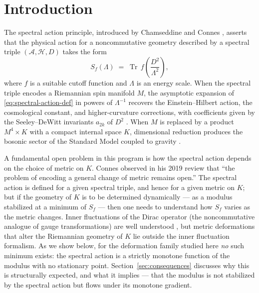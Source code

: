 \documentclass[12pt]{article}
\theoremstyle{definition}
\theoremstyle{remark}
\DeclareMathOperator{\Tr}{Tr}
\begin{document}
\section{Introduction}

The spectral action principle, introduced by Chamseddine and Connes
\cite{Chamseddine1997}, asserts that the physical
action for a noncommutative geometry described by a spectral triple
$(\mathcal{A}, \mathcal{H}, D)$ takes the form
\begin{equation}\label{eq:spectral-action-def}
  S_f(\Lambda) \;=\; \Tr\, f\!\left(\frac{D^2}{\Lambda^2}\right),
\end{equation}
where $f$ is a suitable cutoff function and $\Lambda$ is an energy
scale.  When the spectral triple encodes a Riemannian spin manifold
$M$, the asymptotic expansion of \eqref{eq:spectral-action-def} in
powers of $\Lambda^{-1}$ recovers the Einstein--Hilbert action, the
cosmological constant, and higher-curvature corrections, with
coefficients given by the Seeley--DeWitt invariants $a_{2k}$ of
$D^2$ \cite{Gilkey1995, Vassilevich2003}.  When
$M$ is replaced by a product $M^4 \times K$ with a compact internal
space $K$, dimensional reduction produces the bosonic sector of the
Standard Model coupled to gravity
\cite{ChamseddineConnesMarcolli2007,
  vanSuijlekom2015}.

A fundamental open problem in this program is how the spectral action
depends on the choice of metric on $K$.  Connes observed in his 2019
review \cite{Connes2019} that ``the problem of encoding
a general change of metric remains open.''  The spectral action is
defined for a given spectral triple, and hence for a given
metric on $K$; but if the geometry of $K$ is to be
determined dynamically --- as a modulus stabilized at a minimum of
$S_f$ --- then one needs to understand how $S_f$ varies as the metric
changes.  Inner fluctuations of the Dirac operator (the
noncommutative analogue of gauge transformations) are well understood
\cite{ChamseddineConnesvanSuijlekom2013}, but metric deformations that
alter the Riemannian geometry of $K$ lie outside the inner
fluctuation formalism.  As we show below, for the deformation family
studied here \emph{no} such minimum exists: the spectral action is a
strictly monotone function of the modulus with no stationary point.
Section~\ref{sec:consequences} discusses why this is structurally
expected, and what it implies --- that the modulus is not stabilized
by the spectral action but flows under its monotone gradient.
\end{document}
